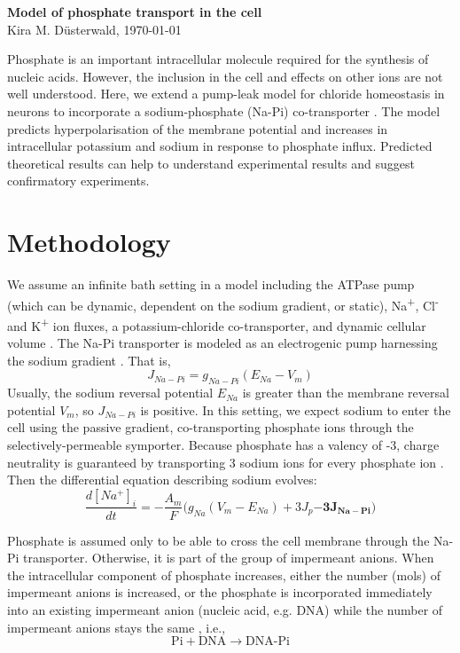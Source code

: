 \documentclass[11pt]{article}[]
\begin{document}
	

\begin{center} \Large \textbf{Model of phosphate transport in the cell}\\ \vskip 2mm
\normalsize {Kira M. D\"usterwald, \today}
\end{center} 

\normalsize

Phosphate is an important intracellular molecule required for the synthesis of nucleic acids. However, the inclusion in the cell and effects on other ions are not well understood. Here, we extend a pump-leak model for chloride homeostasis in neurons to incorporate a sodium-phosphate (Na-Pi) co-transporter \cite{Dusterwald2018}. The model predicts hyperpolarisation of the membrane potential and increases in intracellular potassium and sodium in response to phosphate influx. Predicted theoretical results can help to understand experimental results and suggest confirmatory experiments.

\section{Methodology}

We assume an infinite bath setting in a model including the ATPase pump (which can be dynamic, dependent on the sodium gradient, or static), Na\textsuperscript{+}, Cl\textsuperscript{-} and K\textsuperscript{+} ion fluxes, a potassium-chloride co-transporter, and dynamic cellular volume \cite{Dusterwald2018}. The Na-Pi transporter is modeled as an electrogenic pump harnessing the sodium gradient \cite{Levi2019}. That is,
\begin{equation}
J_{Na-Pi} = g_{Na-Pi} (E_{Na}-V_m)
\end{equation}
Usually, the sodium reversal potential $E_{Na}$ is greater than the membrane reversal potential $V_m$, so $J_{Na-Pi}$ is positive. In this setting, we expect sodium to enter the cell using the passive gradient, co-transporting phosphate ions through the selectively-permeable symporter. Because phosphate has a valency of -3, charge neutrality is guaranteed by transporting 3 sodium ions for every phosphate ion \cite{Levi2019}. Then the differential equation describing sodium evolves:
\begin{equation}
\frac{d[Na^+]_i}{dt}=-\frac{A_m}{F}\big(g_{Na}(V_m-E_{Na})+3J_p\mathbf{-3J_{Na-Pi}}\big)
\end{equation}

Phosphate is assumed only to be able to cross the cell membrane through the Na-Pi transporter. Otherwise, it is part of the group of impermeant anions. When the intracellular component of phosphate increases, either the number (mols) of impermeant anions is increased, or the phosphate is incorporated immediately into an existing impermeant anion (nucleic acid, e.g. DNA) while the number of impermeant anions stays the same \cite{Engstrom1983}, i.e., 
\begin{equation}
\text{Pi}+\text{DNA} \rightarrow \text{DNA-Pi}
\end{equation}
\end{document}
